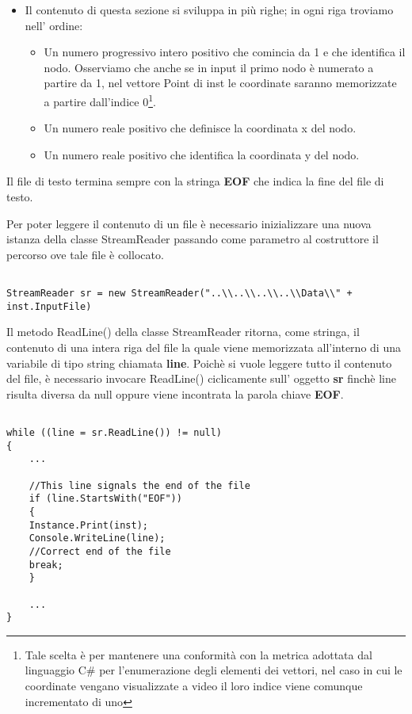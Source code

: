 \documentclass[11pt]{article}
\begin{document}
\begin{itemize}
\begin{itemize}
    \item Il contenuto di questa sezione si sviluppa in più righe; in ogni riga troviamo nell' ordine:
    \begin{itemize}
    \item Un numero progressivo intero positivo che comincia da 1 e che identifica il nodo. Osserviamo che anche se in input il primo nodo è numerato a partire da 1, nel vettore Point di inst le coordinate saranno memorizzate a partire dall'indice 0\footnote{Tale scelta è per mantenere una conformità con la metrica adottata dal linguaggio C\# per l'enumerazione degli elementi dei vettori, nel caso in cui le coordinate vengano visualizzate a video il loro indice viene comunque incrementato di uno}.
    \item Un numero reale positivo che definisce la coordinata x del nodo.
    \item Un numero reale positivo che identifica la coordinata y del nodo.
    \end{itemize}        
    \end{itemize}    
\end{itemize}

Il file di testo termina sempre con la stringa \textbf{EOF} che indica la fine del file di testo.

Per poter leggere il contenuto di un file è necessario inizializzare una nuova istanza della classe StreamReader passando come parametro al costruttore il percorso ove tale file è  collocato.


\begin{lstlisting}

StreamReader sr = new StreamReader("..\\..\\..\\..\\Data\\" + inst.InputFile)

\end{lstlisting}


Il metodo ReadLine() della classe StreamReader ritorna, come stringa, il contenuto di una intera riga del file la quale viene memorizzata all'interno di una variabile di tipo string chiamata \textbf{line}. Poichè si vuole leggere tutto il contenuto del file, è necessario invocare ReadLine() ciclicamente sull' oggetto \textbf{sr} finchè line risulta diversa da null oppure viene incontrata la parola chiave \textbf{EOF}.

\begin{lstlisting}

while ((line = sr.ReadLine()) != null)
{
    ...
    
    //This line signals the end of the file
    if (line.StartsWith("EOF"))
    {
    Instance.Print(inst);
    Console.WriteLine(line);
    //Correct end of the file
    break;
    }
    
    ...
}
\end{lstlisting}
\end{document}

